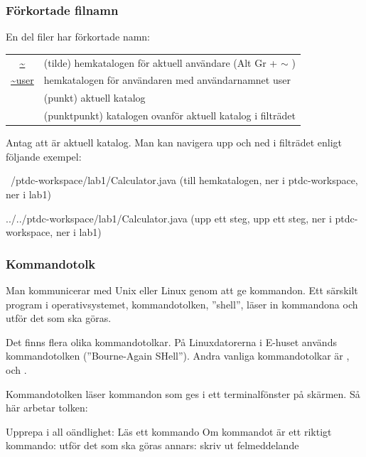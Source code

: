 \begin{frame}[fragile=singleslide]
    \frametitle{Förkortade filnamn}
    En del filer har förkortade namn:

    \blankline
    \begin{tabular}{cl}
        \url{~}     & (tilde) hemkatalogen för aktuell användare (Alt Gr + $\sim$ ) \\
        \url{~user} & hemkatalogen för användaren med användarnamnet user           \\
        \code{.}    & (punkt) aktuell katalog                                       \\
        \code{..}   & (punktpunkt) katalogen ovanför aktuell katalog i filträdet    \\
    \end{tabular}

    \blankline
    Antag att  är aktuell katalog. Man kan navigera upp och ned i filträdet enligt följande exempel:

    \begin{GobbleCode}{6}
        ~/ptdc-workspace/lab1/Calculator.java
        (till hemkatalogen, ner i ptdc-workspace, ner i lab1)

        ../../ptdc-workspace/lab1/Calculator.java
        (upp ett steg, upp ett steg, ner i ptdc-workspace, ner i lab1)
    \end{GobbleCode}

\end{frame}

\begin{frame}[fragile=singleslide]
    \frametitle{Kommandotolk}
    Man kommunicerar med Unix eller Linux genom att ge kommandon. Ett särskilt program i operativsystemet, kommandotolken, ''shell'', läser in kommandona och utför det som ska göras.

    \pindent Det finns flera olika kommandotolkar. På Linuxdatorerna i E-huset används kommandotolken  (''Bourne-Again SHell''). Andra vanliga kommandotolkar är ,  och .

    \pindent Kommandotolken läser kommandon som ges i ett terminalfönster på skärmen. Så här arbetar tolken:

    \begin{GobbleCode}{4}
        Upprepa i all oändlighet:
            Läs ett kommando
            Om kommandot är ett riktigt kommando:
                utför det som ska göras
            annars:
                skriv ut felmeddelande
    \end{GobbleCode}

\end{frame}

